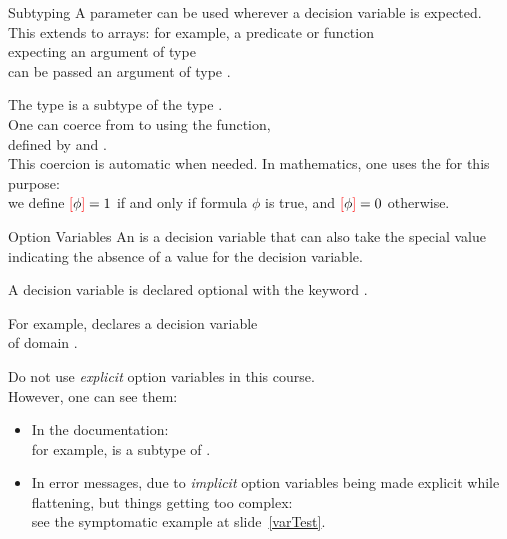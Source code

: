 \documentclass{cons-beamer}
\begin{document}
\begin{flashcardminizinc}
\begin{frame}{Subtyping}\label{Iverson}
  A parameter can be used wherever a decision variable is expected. \\
  This extends to arrays: for example, a predicate or function \\
  expecting an argument of type  \\
  can be passed an argument of type .
  \vfill

  The type  is a subtype of the type . \\
  One can coerce from  to  using the
   function, \\ defined by
   and
  . \\
  This coercion is automatic when needed. \vfill
  In mathematics, one uses the  for this
  purpose: \\ we define ${\textcolor{red}{\left[\textcolor{black}{\phi}\right]}} = 1$ if and only if formula
  $\phi$ is true, and ${\textcolor{red}{\left[\textcolor{black}{\phi}\right]}} = 0$ otherwise.
\end{frame}

\begin{frame}{Option Variables}\label{optVar}
  An  is a decision variable that can also
  take the special value \mzninline{<>} indicating the absence of a
  value for the decision variable. \vfill

  A decision variable is declared optional with the keyword
  .  \vfill

  For example,  declares a decision
  variable  \\ of domain .
  \vfill

  \alert{Do not use \emph{explicit} option variables in this course.} \\
  However, one can see them:
  \begin{itemize}
  \item In the documentation: \\ for example,  is a
    subtype of .
  \item In error messages, due to \emph{implicit} option variables
    being made explicit while flattening, but things getting too
    complex: \\ see the symptomatic example at slide~\ref{varTest}.
  \end{itemize}
\end{frame}


\end{flashcardminizinc}
\end{document}

